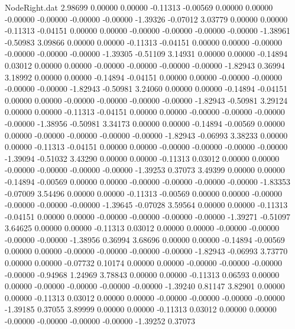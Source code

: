\begin{filecontents}{NodeRight.dat}
   2.98699    0.00000    0.00000    -0.11313   -0.00569    0.00000    0.00000   -0.00000   -0.00000   -0.00000   -0.00000   -1.39326   -0.07012
   3.03779    0.00000    0.00000    -0.11313   -0.04151    0.00000    0.00000   -0.00000   -0.00000   -0.00000   -0.00000   -1.38961   -0.50983
   3.09866    0.00000    0.00000    -0.11313   -0.04151    0.00000    0.00000   -0.00000   -0.00000   -0.00000   -0.00000   -1.39305   -0.51109
   3.14931    0.00000    0.00000    -0.14894    0.03012    0.00000    0.00000   -0.00000   -0.00000   -0.00000   -0.00000   -1.82943    0.36994
   3.18992    0.00000    0.00000    -0.14894   -0.04151    0.00000    0.00000   -0.00000   -0.00000   -0.00000   -0.00000   -1.82943   -0.50981
   3.24060    0.00000    0.00000    -0.14894   -0.04151    0.00000    0.00000   -0.00000   -0.00000   -0.00000   -0.00000   -1.82943   -0.50981
   3.29124    0.00000    0.00000    -0.11313   -0.04151    0.00000    0.00000   -0.00000   -0.00000   -0.00000   -0.00000   -1.38956   -0.50981
   3.34173    0.00000    0.00000    -0.14894   -0.00569    0.00000    0.00000   -0.00000   -0.00000   -0.00000   -0.00000   -1.82943   -0.06993
   3.38233    0.00000    0.00000    -0.11313   -0.04151    0.00000    0.00000   -0.00000   -0.00000   -0.00000   -0.00000   -1.39094   -0.51032
   3.43290    0.00000    0.00000    -0.11313    0.03012    0.00000    0.00000   -0.00000   -0.00000   -0.00000   -0.00000   -1.39253    0.37073
   3.49399    0.00000    0.00000    -0.14894   -0.00569    0.00000    0.00000   -0.00000   -0.00000   -0.00000   -0.00000   -1.83353   -0.07009
   3.54496    0.00000    0.00000    -0.11313   -0.00569    0.00000    0.00000   -0.00000   -0.00000   -0.00000   -0.00000   -1.39645   -0.07028
   3.59564    0.00000    0.00000    -0.11313   -0.04151    0.00000    0.00000   -0.00000   -0.00000   -0.00000   -0.00000   -1.39271   -0.51097
   3.64625    0.00000    0.00000    -0.11313    0.03012    0.00000    0.00000   -0.00000   -0.00000   -0.00000   -0.00000   -1.38956    0.36994
   3.68696    0.00000    0.00000    -0.14894   -0.00569    0.00000    0.00000   -0.00000   -0.00000   -0.00000   -0.00000   -1.82943   -0.06993
   3.73770    0.00000    0.00000    -0.07732    0.10174    0.00000    0.00000   -0.00000   -0.00000   -0.00000   -0.00000   -0.94968    1.24969
   3.78843    0.00000    0.00000    -0.11313    0.06593    0.00000    0.00000   -0.00000   -0.00000   -0.00000   -0.00000   -1.39240    0.81147
   3.82901    0.00000    0.00000    -0.11313    0.03012    0.00000    0.00000   -0.00000   -0.00000   -0.00000   -0.00000   -1.39185    0.37055
   3.89999    0.00000    0.00000    -0.11313    0.03012    0.00000    0.00000   -0.00000   -0.00000   -0.00000   -0.00000   -1.39252    0.37073

\end{filecontents}

